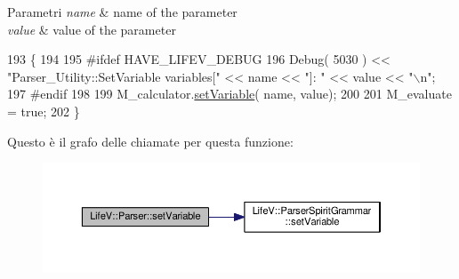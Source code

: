 \begin{DoxyParams}{Parametri}
{\em name} & name of the parameter \\
\hline
{\em value} & value of the parameter \\
\hline
\end{DoxyParams}

\begin{DoxyCode}
193 \{
194 
195 \textcolor{preprocessor}{#ifdef HAVE\_LIFEV\_DEBUG}
196 \textcolor{preprocessor}{}    Debug( 5030 ) << \textcolor{stringliteral}{"Parser\_Utility::SetVariable    variables["} << name << \textcolor{stringliteral}{"]: "} << value << \textcolor{stringliteral}{"\(\backslash\)n"};
197 \textcolor{preprocessor}{#endif}
198 \textcolor{preprocessor}{}
199     M\_calculator.\hyperlink{classLifeV_1_1ParserSpiritGrammar_a357a7e8d98940858ac6e05c106082e2e}{setVariable}( name, value);
200 
201     M\_evaluate = \textcolor{keyword}{true};
202 \}
\end{DoxyCode}


Questo è il grafo delle chiamate per questa funzione\-:
\nopagebreak
\begin{figure}[H]
\begin{center}
\leavevmode
\includegraphics[width=350pt]{classLifeV_1_1Parser_aa2b362e12b8feb60231705d499c9fbae_cgraph}
\end{center}
\end{figure}





